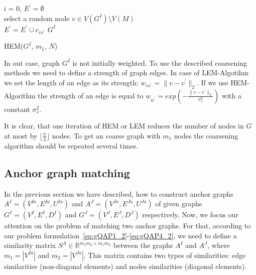 \begin{algorithm}[h]
	i = 0, $E^\prime=\emptyset$ \\
	{ select a random node $v\in V(G^I)\setminus V(M)$ \\
	  {$E^\prime=E^\prime\cup{e_{vv^\prime}}$}
	}
	\Return $G^I$
	\caption{HEM($G^I$, $m_1$, $N$)} \label{alg:HEM}
\end{algorithm}

In out case, graph $G^I$ is not initially weighted. To use the described coarsening methods we need to define a strength of graph edges. In case of LEM-Algotihm we set the length of an edge as its strength: $w_{vv^\prime}=\|v-v^\prime\|_{2}$. If we use HEM-Algorithm the strength of an edge is equal to $w_{ii^\prime} = exp(-\frac{\|v-v^\prime\|_{2}}{\sigma^2_{s}})$ with a constant $\sigma^2_{s}$.

It is clear, that one iteration of HEM or LEM reduces the number of nodes in $G$ at most by $\lfloor\frac{n}{2} \rfloor$ nodes. To get an coarse graph with $m_1$ nodes the coarsening algorithm should be repeated several times.

\subsection{Anchor graph matching}
In the previous section we have described, how to construct anchor graphs $A^I=(V^{Ia},E^{Ia}, U^{Ia})$ and $A^J=(V^{Ja},E^{Ja},U^{Ja})$ of given graphs $G^I = (V^I, E^I, D^I)$ and $G^J=(V^J, E^J, D^J)$ respectively. Now, we focus our attention on the problem of matching two anchor graphs. For that, according to our problem formulation~\eqref{eq:gQAP1_2}-\eqref{eq:gQAP4_2}, we need to define a similarity matrix $S^A\in\mathbb{R}^{m_1m_2\times m_1m_2}$ between the graphs $A^I$ and $A^J$, where $m_1=|V^{Ia}|$ and $m_2=|V^{Ja}|$. This matrix contains two types of similarities: edge similarities (non-diagonal elements) and nodes similarities (diagonal elements).


